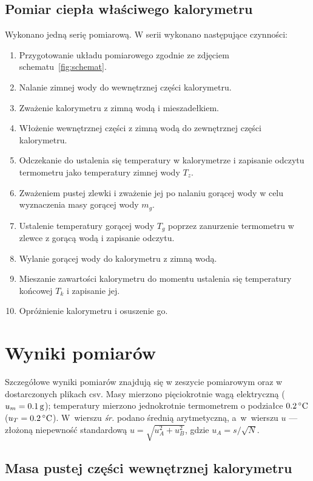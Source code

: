\documentclass[12pt, a4paper]{article}
\begin{document}
\subsection{Pomiar ciepła właściwego kalorymetru}
Wykonano jedną serię pomiarową. W serii wykonano następujące czynności:
\begin{enumerate}
    \item Przygotowanie układu pomiarowego zgodnie ze zdjęciem schematu~\ref{fig:schemat}.
    \item Nalanie zimnej wody do wewnętrznej części kalorymetru.
    \item Zważenie kalorymetru z zimną wodą i mieszadełkiem.
    \item Włożenie wewnętrznej części z zimną wodą do zewnętrznej części kalorymetru.
    \item Odczekanie do ustalenia się temperatury w kalorymetrze i zapisanie odczytu termometru jako temperatury zimnej wody $T_z$.
    \item Zważeniem pustej zlewki i zważenie jej po nalaniu gorącej wody w celu wyznaczenia masy gorącej wody $m_g$.
    \item Ustalenie temperatury gorącej wody $T_g$ poprzez zanurzenie termometru w zlewce z gorącą wodą i zapisanie odczytu.
    \item Wylanie gorącej wody do kalorymetru z zimną wodą.
    \item Mieszanie zawartości kalorymetru do momentu ustalenia się temperatury końcowej $T_k$ i zapisanie jej.
    \item Opróżnienie kalorymetru i osuszenie go.
\end{enumerate}




\section{Wyniki pomiarów}
Szczegółowe wyniki pomiarów znajdują się w zeszycie pomiarowym oraz w dostarczonych
plikach csv.
Masy mierzono pięciokrotnie wagą elektryczną ($u_m = \qty{0{,}1}{\gram}$); temperatury mierzono jednokrotnie
termometrem o podziałce $\qty{0{,}2}{\degreeCelsius}$ ($u_T = \qty{0{,}2}{\degreeCelsius}$).
W~wierszu \textit{śr.} podano średnią arytmetyczną, a~w~wierszu $u$ --- złożoną niepewność standardową
$u = \sqrt{u_A^2 + u_B^2}$, gdzie $u_A = s/\!\sqrt{N}$.

\subsection{Masa pustej części wewnętrznej kalorymetru}\label{sec:wyniki_mk}
\end{document}
